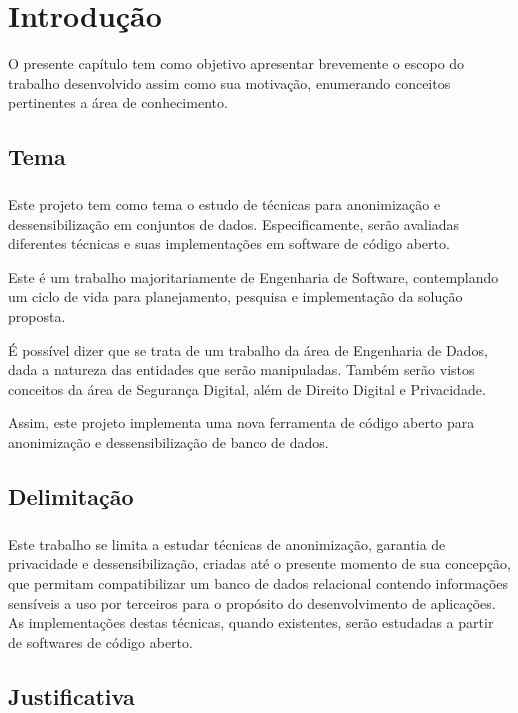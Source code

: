 \chapter{Introdução}
\label{cap1}

O presente capítulo tem como objetivo apresentar brevemente o escopo do trabalho desenvolvido assim como sua motivação, enumerando conceitos pertinentes a área de conhecimento.

\section{Tema}

\paragraph{} Este projeto tem como tema o estudo de técnicas para anonimização e dessensibilização em conjuntos de dados. Especificamente, serão avaliadas diferentes técnicas e suas implementações em software de código aberto.

Este é um trabalho majoritariamente de Engenharia de Software, contemplando um ciclo de vida para planejamento, pesquisa e implementação da solução proposta.

É possível dizer que se trata de um trabalho da área de Engenharia de Dados, dada a natureza das entidades que serão manipuladas. Também serão vistos conceitos da área de Segurança Digital, além de Direito Digital e Privacidade.

Assim, este projeto implementa uma nova ferramenta de código aberto para anonimização e dessensibilização de banco de dados.


\section{Delimitação}

\paragraph{} Este trabalho se limita a estudar técnicas de anonimização, garantia de privacidade e dessensibilização, criadas até o presente momento de sua concepção, que permitam compatibilizar um banco de dados relacional contendo informações sensíveis a uso por terceiros para o propósito do desenvolvimento de aplicações. As implementações destas técnicas, quando existentes, serão estudadas a partir de softwares de código aberto.

\section{Justificativa}

